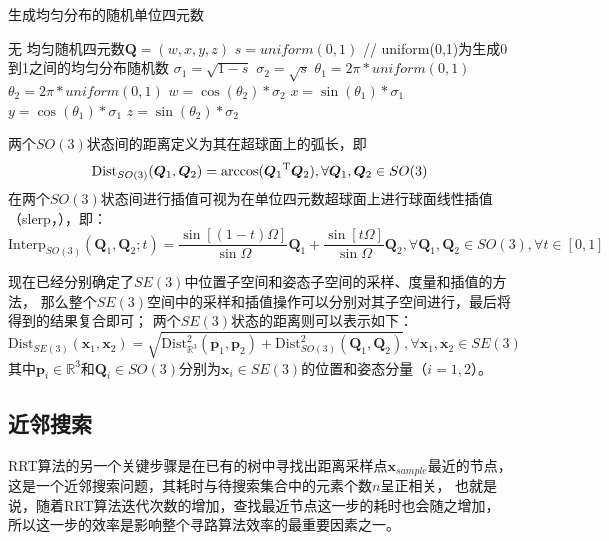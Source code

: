 \begin{algorithm}[H]
  \wuhao
  \caption{生成均匀分布的随机单位四元数\label{alg:uniform_unit_quaternion}}  
  \begin{algorithmic}[1] %
      \REQUIRE 无  
      \ENSURE 均匀随机四元数$\bm{Q}=(w,x,y,z)$
      \STATE $s=uniform(0,1)$ // uniform(0,1)为生成0到1之间的均匀分布随机数
      \STATE $\sigma_{1}=\sqrt{1-s}$
      \STATE $\sigma_{2}=\sqrt{s}$
      \STATE $\theta_{1}=2\pi*uniform(0,1)$
      \STATE $\theta_{2}=2\pi*uniform(0,1)$
      \STATE $w=\cos(\theta_{2})*\sigma_{2}$
      \STATE $x=\sin(\theta_{1})*\sigma_{1}$
      \STATE $y=\cos(\theta_{1})*\sigma_{1}$
      \STATE $z=\sin(\theta_{2})*\sigma_{2}$
  \end{algorithmic}  
\end{algorithm} 

两个$SO(3)$状态间的距离定义为其在超球面上的弧长，即
\begin{equation}
  \text{Dist}_{SO(3)}(\bm{Q}_1, \bm{Q}_2) = \arccos({\bm{Q}_1}^{\text{T}}\bm{Q}_2), \forall \bm{Q}_1, \bm{Q}_2 \in SO(3)
  \label{equ:distance_in_SO3}
\end{equation}
在两个$SO(3)$状态间进行插值可视为在单位四元数超球面上进行球面线性插值（slerp，），即：
\begin{equation}
  \text{Interp}_{SO(3)}(\bm{Q}_1, \bm{Q}_2; t) = 
  \frac{\sin[(1-t)\varOmega]}{\sin\varOmega}\bm{Q}_1 + \frac{\sin[t\varOmega]}{\sin\varOmega}\bm{Q}_2, 
  \forall \bm{Q}_1, \bm{Q}_2 \in SO(3), \forall t \in [0, 1]
  \label{equ:interpolation_in_SO3}
\end{equation}

现在已经分别确定了$SE(3)$中位置子空间和姿态子空间的采样、度量和插值的方法，
那么整个$SE(3)$空间中的采样和插值操作可以分别对其子空间进行，最后将得到的结果复合即可；
两个$SE(3)$状态的距离则可以表示如下：
\begin{equation}
  \text{Dist}_{SE(3)}(\bm{x}_1, \bm{x}_2) = 
  \sqrt{\text{Dist}_{\mathbb{R}^3}^2(\bm{p}_1, \bm{p}_2) + \text{Dist}_{SO(3)}^2(\bm{Q}_1, \bm{Q}_2)}, 
  \forall \bm{x}_1, \bm{x}_2 \in SE(3)
  \label{equ:distance_in_SE3}
\end{equation}
其中$\bm{p}_i \in \mathbb{R}^3$和$\bm{Q}_i \in SO(3)$分别为$\bm{x}_i \in SE(3)$的位置和姿态分量（$i=1,2$）。
\subsection{近邻搜索}\label{subsuc:near_search}
RRT算法的另一个关键步骤是在已有的树中寻找出距离采样点$\bm{x}_{sample}$最近的节点，
这是一个近邻搜索问题，其耗时与待搜索集合中的元素个数$n$呈正相关，
也就是说，随着RRT算法迭代次数的增加，查找最近节点这一步的耗时也会随之增加，
所以这一步的效率是影响整个寻路算法效率的最重要因素之一。


